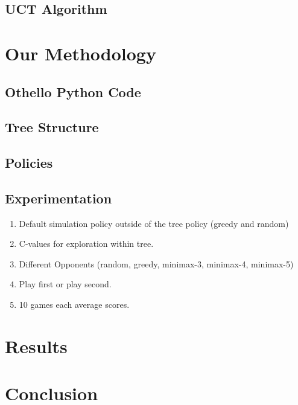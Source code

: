 \documentclass[12pt,letterpaper]{article}
\begin{document}
\subsection{UCT Algorithm}



\section{Our Methodology}
\label{meth}

\subsection{Othello Python Code}

\subsection{Tree Structure}

\subsection{Policies}

\subsection{Experimentation}



\begin{enumerate}
\item Default simulation policy outside of the tree policy (greedy and random)
\item C-values for exploration within tree.
\item Different Opponents (random, greedy, minimax-3, minimax-4, minimax-5)
\item Play first or play second.
\item 10 games each average scores.

\end{enumerate}

\section{Results}
\label{results}


\section{Conclusion}
\label{conc}
\end{document}
